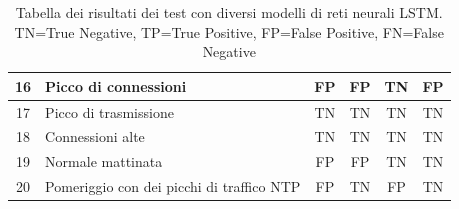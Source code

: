 \begin{table}
\begin{tabularx}{\textwidth}{||c X c c c c||}
        \hline 
        16 & Picco di connessioni & \cellcolor{orange} FP & \cellcolor{orange} FP & TN &  \cellcolor{orange} FP \\        
        \hline
        17 & Picco di trasmissione & TN & TN & TN & TN\\        
        \hline
        18 & Connessioni alte & TN & TN & TN & TN\\
        \hline
        19 & Normale mattinata & \cellcolor{orange} FP & \cellcolor{orange} FP & TN & TN \\ 
        \hline
        20 & Pomeriggio con dei picchi di traffico NTP & \cellcolor{orange} FP & TN & \cellcolor{orange} FP & TN\\ 
        \hline
    \end{tabularx}
    \caption{Tabella dei risultati dei test con diversi modelli di reti neurali LSTM. TN=True Negative, TP=True Positive,  FP=False Positive,  FN=False Negative}
    \label{table:LSTM_tests}
\end{table}
\FloatBarrier
